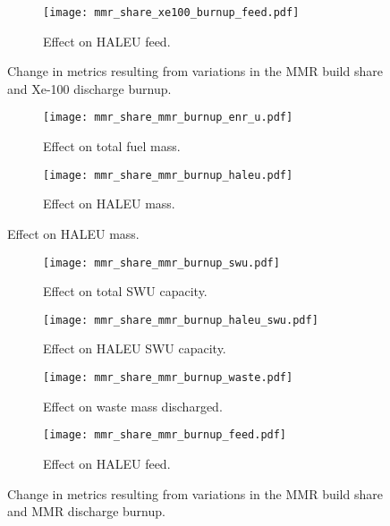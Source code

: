 \begin{figure}
    \ContinuedFloat
    \begin{subfigure}[b]{0.48\textwidth}
        \centering
        \texttt{[image: mmr\_share\_xe100\_burnup\_feed.pdf]}
        \caption{Effect on HALEU feed.}
        \label{fig:mmr_share_xe100_burnup_feed}
    \end{subfigure}
    \caption{Change in metrics resulting from variations in the 
    MMR build share and Xe-100 discharge burnup.}
    \label{fig:mmr_share_xe100_burnup}
\end{figure}

\begin{figure}
    \begin{subfigure}[b]{0.48\textwidth}
        \centering
        \texttt{[image: mmr\_share\_mmr\_burnup\_enr\_u.pdf]}
        \caption{Effect on total fuel mass.}
        \label{fig:mmr_share_mmr_burnup_enr_u}
    \end{subfigure}
    \hfill
    \begin{subfigure}[b]{0.48\textwidth}
        \centering
        \texttt{[image: mmr\_share\_mmr\_burnup\_haleu.pdf]}
        \caption{Effect on HALEU mass.}
        \label{fig:mmr_share_mmr_burnup_haleu}
    \end{subfigure}
\end{figure}

\begin{figure}
    \ContinuedFloat    
    \begin{subfigure}[b]{0.48\textwidth}
        \centering
        \texttt{[image: mmr\_share\_mmr\_burnup\_swu.pdf]}
        \caption{Effect on total SWU capacity.}
        \label{fig:mmr_share_mmr_burnup_swu}
    \end{subfigure}
    \hfill
    \begin{subfigure}[b]{0.48\textwidth}
        \centering
        \texttt{[image: mmr\_share\_mmr\_burnup\_haleu\_swu.pdf]}
        \caption{Effect on HALEU SWU capacity.}
        \label{fig:mmr_share_mmr_burnup_haleu_swu}
    \end{subfigure}
    
    \begin{subfigure}[b]{0.48\textwidth}
        \centering
        \texttt{[image: mmr\_share\_mmr\_burnup\_waste.pdf]}
        \caption{Effect on waste mass discharged.}
        \label{fig:mmr_share_mmr_burnup_waste}
    \end{subfigure}
    \hfill
    \begin{subfigure}[b]{0.48\textwidth}
        \centering
        \texttt{[image: mmr\_share\_mmr\_burnup\_feed.pdf]}
        \caption{Effect on HALEU feed.}
        \label{fig:mmr_share_mmr_burnup_feed}
    \end{subfigure}
    \caption{Change in metrics resulting from variations in the 
    MMR build share and MMR discharge burnup.}
    \label{fig:mmr_share_mmr_burnup}
\end{figure}

